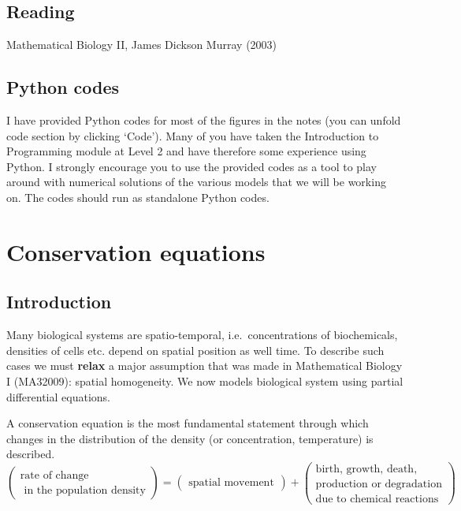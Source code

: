 \documentclass[
  letterpaper,
  DIV=11,
  numbers=noendperiod]{scrreprt}
\theoremstyle{plain}
\theoremstyle{definition}
\theoremstyle{plain}
\theoremstyle{remark}
\begin{document}
\hypertarget{reading}{%
\section*{Reading}\label{reading}}


Mathematical Biology II, James Dickson Murray (2003)

\hypertarget{python-codes}{%
\section*{Python codes}\label{python-codes}}


I have provided Python codes for most of the figures in the notes (you
can unfold code section by clicking `Code'). Many of you have taken the
Introduction to Programming module at Level 2 and have therefore some
experience using Python. I strongly encourage you to use the provided
codes as a tool to play around with numerical solutions of the various
models that we will be working on. The codes should run as standalone
Python codes.


\hypertarget{conservation-equations}{%
\chapter{Conservation equations}\label{conservation-equations}}

\hypertarget{sec-conservation}{%
\section{Introduction}\label{sec-conservation}}

Many biological systems are spatio-temporal, i.e.~concentrations of
biochemicals, densities of cells etc. depend on spatial position as well
time. To describe such cases we must \textbf{relax} a major assumption
that was made in Mathematical Biology I (MA32009): spatial homogeneity.
We now models biological system using partial differential equations.

A conservation equation is the most fundamental statement through which
changes in the distribution of the density (or concentration,
temperature) is described. \[
\begin{pmatrix}
\text{rate of change}\\
\text{ in the population density} 
\end{pmatrix}
= \begin{pmatrix}
\text{spatial movement}
\end{pmatrix}
+ 
 \begin{pmatrix}
 \text{birth, growth, death},\\
 \text{production or degradation}\\
  \text{due to chemical reactions} 
\end{pmatrix}
\]
\end{document}
